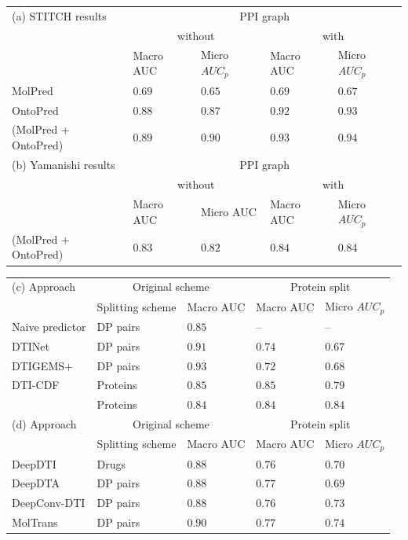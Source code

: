 \documentclass{bioinfo}
\begin{document}
\begin{table}[!tpb]
  \centering
	\begin{tabular}{|p{2.2cm}|p{0.9cm}|p{0.75cm}|p{0.9cm}|p{0.75cm}|}
		\hline
		(a) STITCH results&\multicolumn{4}{c|}{PPI graph}\\
		&\multicolumn{2}{c|}{without}&\multicolumn{2}{c|}{with}\\
		&Macro AUC&Micro $AUC_p$&Macro AUC&Micro $AUC_p$\\
		\hline
		MolPred&$0.69$&$0.65$&$0.69$&$0.67$\\
		\hline
		OntoPred&$0.88$&$0.87$&$0.92$&$0.93$\\
		\hline
		\name (MolPred + OntoPred) & $0.89$ & $0.90$&$\mathbf{0.93}$&$\mathbf{0.94}$\\
		\hline
		\hline
		(b) Yamanishi results&\multicolumn{4}{c|}{PPI graph}\\
		&\multicolumn{2}{c|}{without}&\multicolumn{2}{c|}{with}\\
		&Macro AUC&Micro AUC&Macro AUC&Micro $AUC_p$\\
		\hline
		\name (MolPred + OntoPred) & $0.83$ & $0.82$&$0.84$&$0.84$\\
		\hline
	\end{tabular} \medskip

	\begin{tabular}{|l|p{1cm}|p{1cm}|p{1cm}|p{1cm}|}
		\hline
		(c) Approach&\multicolumn{2}{c|}{Original scheme}&\multicolumn{2}{c|}{Protein split}\\
		&Splitting scheme&Macro AUC&Macro AUC&Micro $AUC_p$\\
		\hline
		Naive predictor&DP pairs&$0.85$& --&--\\
		DTINet&DP pairs&$0.91$&$0.74$&$0.67$\\
		DTIGEMS+&DP pairs&$\mathbf{0.93}$& $0.72$& $0.68$ \\
		DTI-CDF&Proteins&$0.85$&$\mathbf{0.85}$&$0.79$\\
		\name&Proteins&$0.84$&$0.84$&$\mathbf{0.84}$\\
		\hline
		\hline
		(d) Approach&\multicolumn{2}{c|}{Original scheme}&\multicolumn{2}{c|}{Protein split}\\
		&Splitting scheme&Macro AUC&Macro AUC&Micro $AUC_p$\\
		\hline
		DeepDTI&Drugs&$0.88$&$0.76$&$0.70$\\
		DeepDTA&DP pairs&$0.88$&$0.77$&$0.69$\\
		DeepConv-DTI&DP pairs&$0.88$&$0.76$&$0.73$\\
		MolTrans&DP pairs&$0.90$&$0.77$&$0.74$\\
		\hline
	\end{tabular}\\
	

\end{table}
\end{document}
